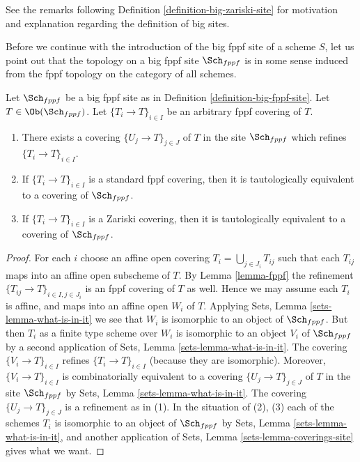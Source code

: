 \noindent
See the remarks following Definition \ref{definition-big-zariski-site}
for motivation and explanation regarding the definition of big sites.

\medskip\noindent
Before we continue with the introduction of the big fppf site of
a scheme $S$, let us point out that the topology on a big fppf site
$\Sch_{fppf}$ is in some sense induced from the fppf topology
on the category of all schemes.

\begin{lemma}
\label{lemma-fppf-induced}
Let $\Sch_{fppf}$ be a big fppf site as in
Definition \ref{definition-big-fppf-site}.
Let $T \in \Ob(\Sch_{fppf})$.
Let $\{T_i \to T\}_{i \in I}$ be an arbitrary fppf covering of $T$.
\begin{enumerate}
\item There exists a covering $\{U_j \to T\}_{j \in J}$ of $T$ in the site
$\Sch_{fppf}$ which refines $\{T_i \to T\}_{i \in I}$.
\item If $\{T_i \to T\}_{i \in I}$ is a standard fppf covering, then
it is tautologically equivalent to a covering of $\Sch_{fppf}$.
\item If $\{T_i \to T\}_{i \in I}$ is a Zariski covering, then
it is tautologically equivalent to a covering of $\Sch_{fppf}$.
\end{enumerate}
\end{lemma}

\begin{proof}
For each $i$ choose an affine open covering $T_i = \bigcup_{j \in J_i} T_{ij}$
such that each $T_{ij}$ maps into an affine open subscheme of $T$. By
Lemma \ref{lemma-fppf}
the refinement $\{T_{ij} \to T\}_{i \in I, j \in J_i}$ is an fppf covering
of $T$ as well. Hence we may assume each $T_i$ is affine, and maps into
an affine open $W_i$ of $T$. Applying
Sets, Lemma \ref{sets-lemma-what-is-in-it}
we see that $W_i$ is isomorphic to an object of $\Sch_{fppf}$.
But then $T_i$ as a finite type scheme over $W_i$
is isomorphic to an object $V_i$ of $\Sch_{fppf}$ by a second
application of
Sets, Lemma \ref{sets-lemma-what-is-in-it}.
The covering $\{V_i \to T\}_{i \in I}$ refines $\{T_i \to T\}_{i \in I}$
(because they are isomorphic).
Moreover, $\{V_i \to T\}_{i \in I}$ is combinatorially equivalent to a
covering $\{U_j \to T\}_{j \in J}$ of $T$ in the site
$\Sch_{fppf}$ by
Sets, Lemma \ref{sets-lemma-what-is-in-it}.
The covering $\{U_j \to T\}_{j \in J}$ is a refinement as in (1).
In the situation of (2), (3) each of the
schemes $T_i$ is isomorphic to an object of $\Sch_{fppf}$ by
Sets, Lemma \ref{sets-lemma-what-is-in-it},
and another application of
Sets, Lemma \ref{sets-lemma-coverings-site}
gives what we want.
\end{proof}

